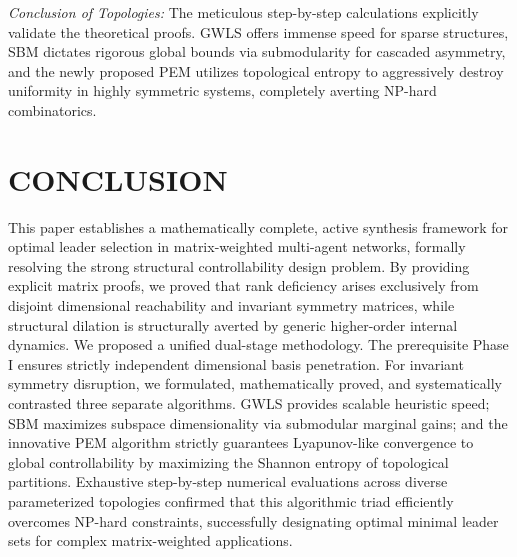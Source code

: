 \documentclass{IEEEtran}
\begin{document}
	\textit{Conclusion of Topologies:} The meticulous step-by-step calculations explicitly validate the theoretical proofs. GWLS offers immense speed for sparse structures, SBM dictates rigorous global bounds via submodularity for cascaded asymmetry, and the newly proposed PEM utilizes topological entropy to aggressively destroy uniformity in highly symmetric systems, completely averting NP-hard combinatorics.
	
	\section{CONCLUSION}
	This paper establishes a mathematically complete, active synthesis framework for optimal leader selection in matrix-weighted multi-agent networks, formally resolving the strong structural controllability design problem. By providing explicit matrix proofs, we proved that rank deficiency arises exclusively from disjoint dimensional reachability and invariant symmetry matrices, while structural dilation is structurally averted by generic higher-order internal dynamics. We proposed a unified dual-stage methodology. The prerequisite Phase I ensures strictly independent dimensional basis penetration. For invariant symmetry disruption, we formulated, mathematically proved, and systematically contrasted three separate algorithms. GWLS provides scalable heuristic speed; SBM maximizes subspace dimensionality via submodular marginal gains; and the innovative PEM algorithm strictly guarantees Lyapunov-like convergence to global controllability by maximizing the Shannon entropy of topological partitions. Exhaustive step-by-step numerical evaluations across diverse parameterized topologies confirmed that this algorithmic triad efficiently overcomes NP-hard constraints, successfully designating optimal minimal leader sets for complex matrix-weighted applications.
	
\end{document}
